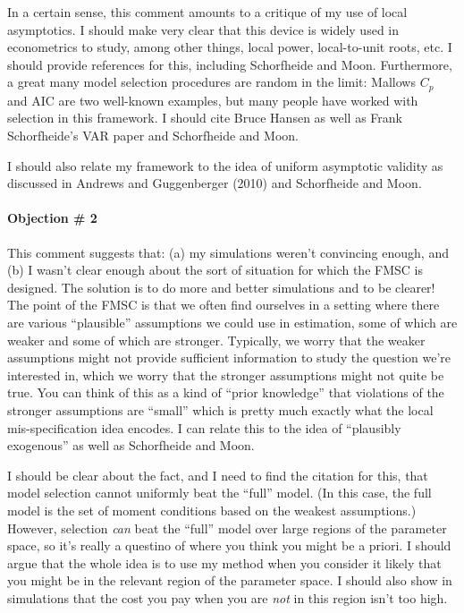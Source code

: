 \documentclass[12pt]{article}
\theoremstyle{definition}
\begin{document}
In a certain sense, this comment amounts to a critique of my use of local asymptotics. I should make very clear that this device is widely used in econometrics to study, among other things, local power, local-to-unit roots, etc. I should provide references for this, including Schorfheide and Moon. Furthermore, a great many model selection procedures are random in the limit: Mallows $C_p$ and AIC are two well-known examples, but many people have worked with selection in this framework. I should cite Bruce Hansen as well as Frank Schorfheide's VAR paper and Schorfheide and Moon.

I should also relate my framework to the idea of uniform asymptotic validity as discussed in Andrews and Guggenberger (2010) and Schorfheide and Moon.


\paragraph{Objection \# 2} This comment suggests that: (a) my simulations weren't convincing enough, and (b) I wasn't clear enough about the sort of situation for which the FMSC is designed. The solution is to do more and better simulations and to be clearer! The point of the FMSC is that we often find ourselves in a setting where there are various ``plausible'' assumptions we could use in estimation, some of which are weaker and some of which are stronger. Typically, we worry that the weaker assumptions might not provide sufficient information to study the question we're interested in, which we worry that the stronger assumptions might not quite be true. You can think of this as a kind of ``prior knowledge'' that violations of the stronger assumptions are ``small'' which is pretty much exactly what the local mis-specification idea encodes. I can relate this to the idea of ``plausibly exogenous'' as well as Schorfheide and Moon. 

I should be clear about the fact, and I need to find the citation for this, that model selection cannot uniformly beat the ``full'' model. (In this case, the full model is the set of moment conditions based on the weakest assumptions.) However, selection \emph{can} beat the ``full'' model over large regions of the parameter space, so it's really a questino of where you think you might be a priori. I should argue that the whole idea is to use my method when you consider it likely that you might be in the relevant region of the parameter space. I should also show in simulations that the cost you pay when you are \emph{not} in this region isn't too high.
\end{document}
